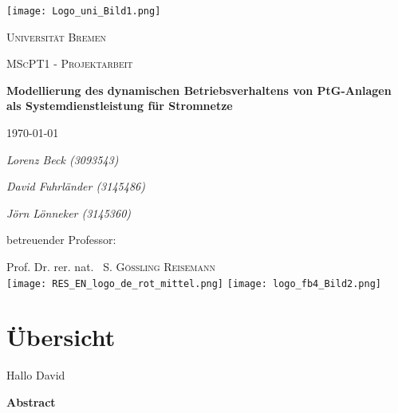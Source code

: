 \documentclass[onecolumn,10pt,titlepage]{article}
\begin{document}
\begin{titlepage}
	\centering
	
	{\texttt{[image: Logo\_uni\_Bild1.png]}\par}
	\vspace{1cm}
	{\scshape\Large Universität Bremen \par}
	\vspace{1cm}
	{\scshape\LARGE MScPT1 - Projektarbeit \par}
	\vspace{1.5cm}
	{\huge\bfseries Modellierung des dynamischen Betriebsverhaltens von PtG-Anlagen als Systemdienstleistung für Stromnetze\par}
	\vspace{2cm}
    {\large \today\par}
    \vspace{2cm}
	{\Large\itshape Lorenz Beck (3093543)\par}
    \vspace{0.3cm}
    {\Large\itshape David Fuhrländer (3145486)\par}
    \vspace{0.3cm}
    {\Large\itshape Jörn Lönneker (3145360)\par}
	\vfill
	betreuender Professor:\par
	Prof. Dr. rer. nat. ~S. \textsc{Gößling Reisemann}\\
    \vfill
   	\texttt{[image: RES\_EN\_logo\_de\_rot\_mittel.png]}
	\hfill	
	\texttt{[image: logo\_fb4\_Bild2.png]}%

	
\end{titlepage}


\section*{Übersicht}
Hallo  David

{\textbf{Abstract}}\par
\end{document}
